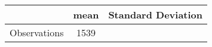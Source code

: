 {
\def\sym#1{\ifmmode^{#1}\else\(^{#1}\)\fi}
\begin{tabular}{l*{1}{cc}}
\hline\hline
                    &      mean&  Standard Deviation\\
\hline
\hline
Observations        &      1539&                    \\
\hline\hline
\end{tabular}
}

